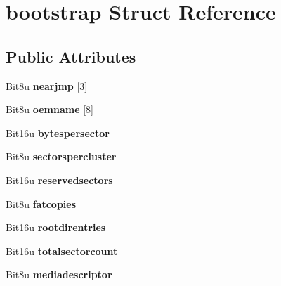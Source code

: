 \hypertarget{structbootstrap}{\section{bootstrap Struct Reference}
\label{structbootstrap}
}
\subsection*{Public Attributes}
\begin{DoxyCompactItemize}
\item 
\hypertarget{structbootstrap_a4d3dd1d9f5ec3e9eff1c874421438173}{Bit8u {\bfseries nearjmp} \mbox{[}3\mbox{]}}\label{structbootstrap_a4d3dd1d9f5ec3e9eff1c874421438173}

\item 
\hypertarget{structbootstrap_a8aef6f58e9ebb01bd6f7233fd33be9e9}{Bit8u {\bfseries oemname} \mbox{[}8\mbox{]}}\label{structbootstrap_a8aef6f58e9ebb01bd6f7233fd33be9e9}

\item 
\hypertarget{structbootstrap_ae063d08a0a2dccb40e5ae77bd986482b}{Bit16u {\bfseries bytespersector}}\label{structbootstrap_ae063d08a0a2dccb40e5ae77bd986482b}

\item 
\hypertarget{structbootstrap_ab0352d5c720223de89bc8fbb809f4ae3}{Bit8u {\bfseries sectorspercluster}}\label{structbootstrap_ab0352d5c720223de89bc8fbb809f4ae3}

\item 
\hypertarget{structbootstrap_ab794dde7b24a9ec4ca2c34469b4b1d4f}{Bit16u {\bfseries reservedsectors}}\label{structbootstrap_ab794dde7b24a9ec4ca2c34469b4b1d4f}

\item 
\hypertarget{structbootstrap_a5ceb31d111b08ac4214c1a7606ad1d02}{Bit8u {\bfseries fatcopies}}\label{structbootstrap_a5ceb31d111b08ac4214c1a7606ad1d02}

\item 
\hypertarget{structbootstrap_a773f97403e5b3057af09a8c90c195183}{Bit16u {\bfseries rootdirentries}}\label{structbootstrap_a773f97403e5b3057af09a8c90c195183}

\item 
\hypertarget{structbootstrap_a5b06af93872b88cce48f470280da3b7c}{Bit16u {\bfseries totalsectorcount}}\label{structbootstrap_a5b06af93872b88cce48f470280da3b7c}

\item 
\hypertarget{structbootstrap_a37d83b4ae3c1105b1cb5ceb6776ea3ab}{Bit8u {\bfseries mediadescriptor}}\label{structbootstrap_a37d83b4ae3c1105b1cb5ceb6776ea3ab}


\end{DoxyCompactItemize}
